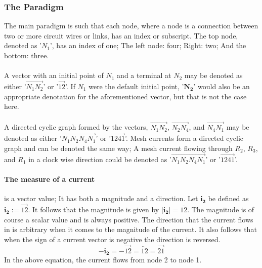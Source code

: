 \documentclass{article}
\begin{document}
	\subsubsection[Paradigm]{The Paradigm}
	The main paradigm is such that each node, where a node is a connection 
	between two or more circuit wires or links, has an index or subscript.  The 
	top node, denoted as '$N_1$', has an index of one;  The left node: four;  
	Right: two;  And the bottom: three. \\ \\
	A vector with an initial point of $N_1$ and a terminal at $N_2$ may be 
	denoted as either '$\overrightarrow{N_1N_2}$' or '$\overrightarrow{12}$'.  
	If $N_1$ were the default initial point, '$\mathbf{N_2}$' would also be an 
	appropriate denotation for the aforementioned vector, but that is not the 
	case here. \\ \\
	A directed cyclic graph formed by the vectors, $\overrightarrow{N_1N_2}$, 
	$\overrightarrow{N_2N_4}$, and $\overrightarrow{N_4N_1}$ may be denoted as 
	either '$\overrightarrow{N_1N_2N_4N_1}$' or '$\overrightarrow{1241}$'.  
	Mesh currents form a directed cyclic graph and can be denoted the same 
	way;  A mesh current flowing through $R_2$, $R_3$, and $R_1$ in a clock 
	wise direction could be denoted as '$\overrightarrow{N_1N_2N_4N_1}$' or 
	'$\overrightarrow{1241}$'. 
	\paragraph[Current Vector]{The measure of a current} is a vector value;  It 
	has both a magnitude and a direction.  Let $\mathbf{i_2}$ be defined as 
	$\mathbf{i_2}:=\overrightarrow{12}$.  It follows that the magnitude is 
	given 
	by $|\mathbf{i_2}| = \overline{12}$.  The magnitude is of course a scalar 
	value and is always positive.  The direction that the current flows in is 
	arbitrary when it comes to the magnitude of the current.  It also follows 
	that when the sign of a current vector is negative the direction is 
	reversed. 
	$$-\mathbf{i_2}=-\overrightarrow{12}=\overleftarrow{12}=\overrightarrow{21}$$
	In the above equation, the current flows from node 2 to node 1.
\end{document}
